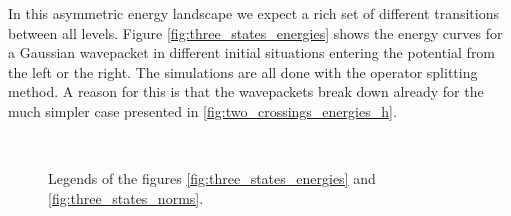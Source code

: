 In this asymmetric energy landscape we expect a rich set of different transitions
between all levels. Figure \ref{fig:three_states_energies} shows the energy curves
for a Gaussian wavepacket in different initial situations entering the potential
from the left or the right. The simulations are all done with the operator splitting
method. A reason for this is that the wavepackets break down already for the much
simpler case presented in \ref{fig:two_crossings_energies_h}.

\begin{figure}
  \centering
   \\
  \caption[Legends]{
    Legends of the figures \ref{fig:three_states_energies} and \ref{fig:three_states_norms}.
  }
\end{figure}

